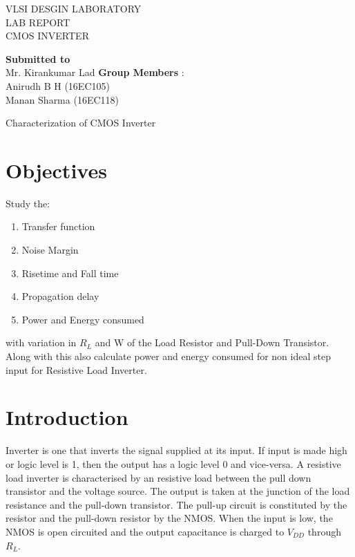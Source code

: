 \documentclass[12pt,a4paper]{article}
\begin{document}
\thispagestyle{empty}
\begin{center}
\large{VLSI DESGIN LABORATORY\\
}
\large{LAB REPORT\\
\vspace{40pt}
CMOS INVERTER}
\end{center}
\vspace{80pt}

\begin{center}
\textbf{Submitted to}\\Mr. Kirankumar Lad
\vspace{80pt}
\textbf{Group Members} :\\
Anirudh B H (16EC105)\\
Manan Sharma (16EC118)\\


\end{center}

\newpage
\thispagestyle{empty}
\setcounter{page}{0}
\tableofcontents
\clearpage

\newpage
\begin{center}
\huge Characterization of CMOS Inverter
\end{center}

\section{Objectives}
Study the:
\begin{enumerate}
    \item Transfer function
    \item Noise Margin
    \item Risetime and Fall time
    \item Propagation delay
    \item Power and Energy consumed
\end{enumerate}
with variation in $R_L$ and W of the Load Resistor and Pull-Down Transistor. Along with this also calculate power and energy consumed for non ideal step input for Resistive Load Inverter.

\section{Introduction}
Inverter is one that inverts the signal supplied at its input. If input is made high or logic level is 1, then the output has a logic level 0 and vice-versa. A resistive load inverter is characterised by an resistive load between the pull down transistor and the voltage source. The output is taken at the junction of the load resistance and the pull-down transistor. The pull-up circuit is constituted by the resistor and the pull-down resistor by the NMOS. When the input is low, the NMOS is open circuited and the output capacitance is charged to $V_{DD}$ through $R_L$. 
\end{document}
